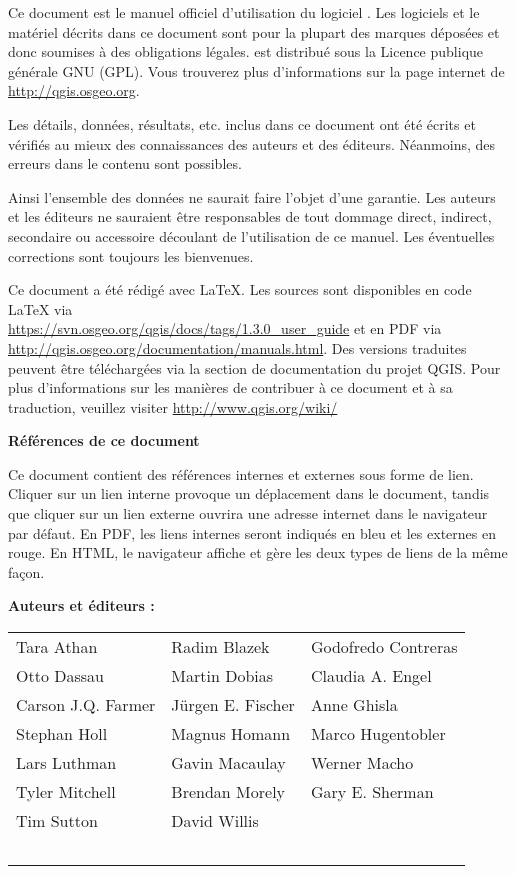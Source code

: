 \frontmatter
\pagestyle{scrplain}
\vspace{1cm}
Ce document est le manuel officiel d'utilisation du logiciel \QG. Les logiciels 
et le matériel décrits dans ce document sont pour la plupart des marques déposées 
et donc soumises à des obligations légales. \QG est distribué sous la Licence 
publique générale GNU (GPL). Vous trouverez plus d'informations sur la page 
internet de \QG \url{http://qgis.osgeo.org}.
\par\bigskip
Les détails, données, résultats, etc. inclus dans ce document ont été écrits et 
vérifiés au mieux des connaissances des auteurs et des éditeurs. Néanmoins, des 
erreurs dans le contenu sont possibles.
\par\bigskip
Ainsi l'ensemble des données ne saurait faire l'objet d'une garantie. Les auteurs 
et les éditeurs ne sauraient être responsables de tout dommage direct, indirect, 
secondaire ou accessoire découlant de l'utilisation de ce manuel. Les éventuelles 
corrections sont toujours les bienvenues.
\par\bigskip
Ce document a été rédigé avec \LaTeX. Les sources sont disponibles en code \LaTeX{} 
via\\ \url{https://svn.osgeo.org/qgis/docs/tags/1.3.0_user_guide} et en PDF via 
\url{http://qgis.osgeo.org/documentation/manuals.html}. 
Des versions traduites peuvent être téléchargées via la section de documentation 
du projet QGIS. Pour plus d'informations sur les manières de contribuer à ce 
document et à sa traduction, veuillez visiter \url{http://www.qgis.org/wiki/} 

\vspace{1cm}
\noindent
\textbf{Références de ce document}
\par\bigskip
Ce document contient des références internes et externes sous forme de lien. 
Cliquer sur un lien interne provoque un déplacement dans le document, tandis 
que cliquer sur un lien externe ouvrira une adresse internet dans le navigateur 
par défaut. En PDF, les liens internes seront indiqués en bleu et les externes 
en rouge. En HTML, le navigateur affiche et gère les deux types de liens de la 
même fa\c{c}on.

\newpage

\begin{flushleft}
\textbf{Auteurs et éditeurs :}
 \par\bigskip\noindent
\begin{tabular}{p{4cm} p{4cm} p{4cm}}
Tara Athan & Radim Blazek & Godofredo Contreras   \\
 Otto Dassau & Martin Dobias & Claudia A. Engel \\ 
 Carson J.Q. Farmer &J\"urgen E. Fischer & Anne Ghisla \\
Stephan Holl &  Magnus Homann& Marco Hugentobler \\ 
 Lars Luthman & Gavin Macaulay & Werner Macho \\
  Tyler Mitchell & Brendan Morely&Gary E. Sherman\\
  Tim Sutton & David Willis \\ \
\end{tabular}
\end{flushleft}

